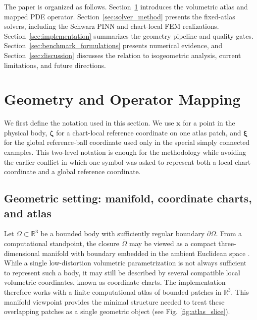 \documentclass[sort&compress]{svjour3} %
\begin{document}
The paper is organized as follows. Section~\ref{sec:methodology} introduces the volumetric atlas and mapped PDE operator. Section~\ref{sec:solver_method} presents the fixed-atlas solvers, including the Schwarz PINN and chart-local FEM realizations. Section~\ref{sec:implementation} summarizes the geometry pipeline and quality gates. Section~\ref{sec:benchmark_formulations} presents numerical evidence, and Section~\ref{sec:discussion} discusses the relation to isogeometric analysis, current limitations, and future directions.

\section{Geometry and Operator Mapping}
\label{sec:methodology}

 We first define the notation used in this section. We use $\boldsymbol{x}$ for a point in the physical body, $\boldsymbol{\zeta}$ for a chart-local reference coordinate on one atlas patch, and $\boldsymbol{\xi}$ for the global reference-ball coordinate used only in the special simply connected examples. This two-level notation is enough for the methodology while avoiding the earlier conflict in which one symbol was asked to represent both a local chart coordinate and a global reference coordinate.

\subsection{Geometric setting: manifold, coordinate charts, and atlas}
\label{sec:atlas_geometry}
Let $\Omega \subset \mathbb{R}^3$ be a bounded body with sufficiently regular boundary $\partial\Omega$. From a computational standpoint, the closure $\overline{\Omega}$ may be viewed as a compact three-dimensional manifold with boundary embedded in the ambient Euclidean space \citep{lee2012introduction}. While a single low-distortion volumetric parametrization is not always sufficient to represent such a body, it may still be described by several compatible local volumetric coordinates, known as coordinate charts. The implementation therefore works with a finite computational atlas of bounded patches in $\mathbb{R}^3$.  This manifold viewpoint provides the minimal structure needed to treat these overlapping patches as a single geometric object (see Fig. \ref{fig:atlas_slice}).
\end{document}
